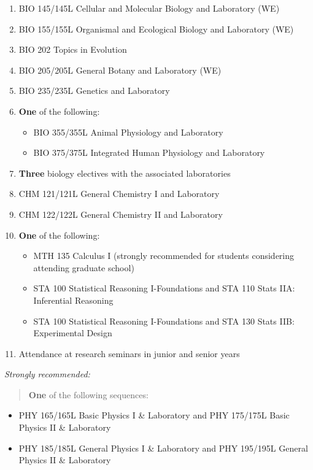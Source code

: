 \documentclass[
  letterpaper,
]{scrbook}
\providecommand{\tightlist}{%
  \setlength{\itemsep}{0pt}\setlength{\parskip}{0pt}}
\begin{document}
\begin{enumerate}
\def\labelenumi{\arabic{enumi}.}
\tightlist
\item
  BIO 145/145L Cellular and Molecular Biology and Laboratory (WE)
\item
  BIO 155/155L Organismal and Ecological Biology and Laboratory (WE)
\item
  BIO 202 Topics in Evolution
\item
  BIO 205/205L General Botany and Laboratory (WE)
\item
  BIO 235/235L Genetics and Laboratory
\item
  \textbf{One} of the following:

  \begin{itemize}
  \tightlist
  \item
    BIO 355/355L Animal Physiology and Laboratory
  \item
    BIO 375/375L Integrated Human Physiology and Laboratory
  \end{itemize}
\item
  \textbf{Three} biology electives with the associated laboratories
\item
  CHM 121/121L General Chemistry I and Laboratory
\item
  CHM 122/122L General Chemistry II and Laboratory
\item
  \textbf{One} of the following:

  \begin{itemize}
  \tightlist
  \item
    MTH 135 Calculus I (strongly recommended for students considering
    attending graduate school)
  \item
    STA 100 Statistical Reasoning I-Foundations and STA 110 Stats IIA:
    Inferential Reasoning
  \item
    STA 100 Statistical Reasoning I-Foundations and STA 130 Stats IIB:
    Experimental Design
  \end{itemize}
\item
  Attendance at research seminars in junior and senior years
\end{enumerate}

\emph{Strongly recommended:}

\begin{quote}
\textbf{One} of the following sequences:
\end{quote}

\begin{itemize}
\tightlist
\item
  PHY 165/165L Basic Physics I \& Laboratory and PHY 175/175L Basic
  Physics II \& Laboratory
\item
  PHY 185/185L General Physics I \& Laboratory and PHY 195/195L General
  Physics II \& Laboratory
\end{itemize}
\end{document}

